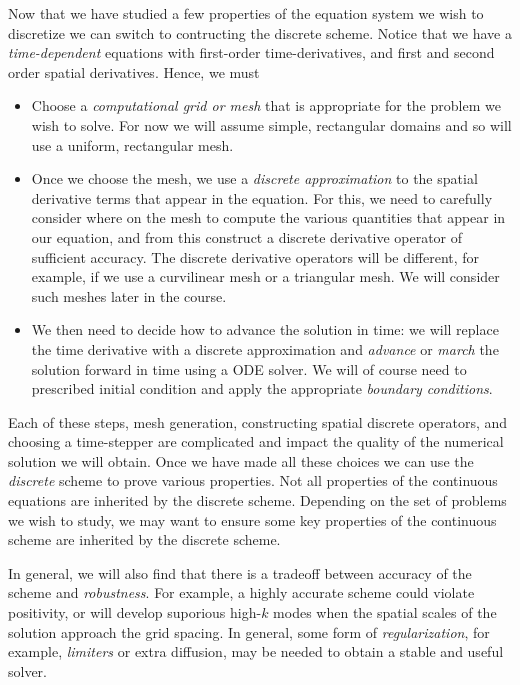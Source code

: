 \documentclass[12pt]{article}
\theoremstyle{definition}
\theoremstyle{definition}
\theoremstyle{definition}
\newcommand{\cramplist}{
	\setlength{\itemsep}{0in}
	\setlength{\partopsep}{0in}
	\setlength{\topsep}{0in}}
\begin{document}
Now that we have studied a few properties of the equation system we
wish to discretize we can switch to contructing the discrete
scheme. Notice that we have a \emph{time-dependent} equations with
first-order time-derivatives, and first and second order spatial
derivatives. Hence, we must
\begin{itemize}\cramplist
\item Choose a \emph{computational grid or mesh} that is appropriate
  for the problem we wish to solve. For now we will assume simple,
  rectangular domains and so will use a uniform, rectangular mesh.
\item Once we choose the mesh, we use a \emph{discrete approximation}
  to the spatial derivative terms that appear in the equation. For
  this, we need to carefully consider where on the mesh to compute the
  various quantities that appear in our equation, and from this
  construct a discrete derivative operator of sufficient accuracy. The
  discrete derivative operators will be different, for example, if we
  use a curvilinear mesh or a triangular mesh. We will consider such
  meshes later in the course.
\item We then need to decide how to advance the solution in time: we
  will replace the time derivative with a discrete approximation and
  \emph{advance} or \emph{march} the solution forward in time using a
  ODE solver. We will of course need to prescribed initial condition
  and apply the appropriate \emph{boundary conditions}.
\end{itemize}

Each of these steps, mesh generation, constructing spatial discrete
operators, and choosing a time-stepper are complicated and impact the
quality of the numerical solution we will obtain. Once we have made
all these choices we can use the \emph{discrete} scheme to prove
various properties. Not all properties of the continuous equations are
inherited by the discrete scheme. Depending on the set of problems we
wish to study, we may want to ensure some key properties of the
continuous scheme are inherited by the discrete scheme.

In general, we will also find that there is a tradeoff between
accuracy of the scheme and \emph{robustness}. For example, a highly
accurate scheme could violate positivity, or will develop suporious
high-$k$ modes when the spatial scales of the solution approach the
grid spacing. In general, some form of \emph{regularization}, for
example, \emph{limiters} or extra diffusion, may be needed to obtain a
stable and useful solver.
\end{document}
